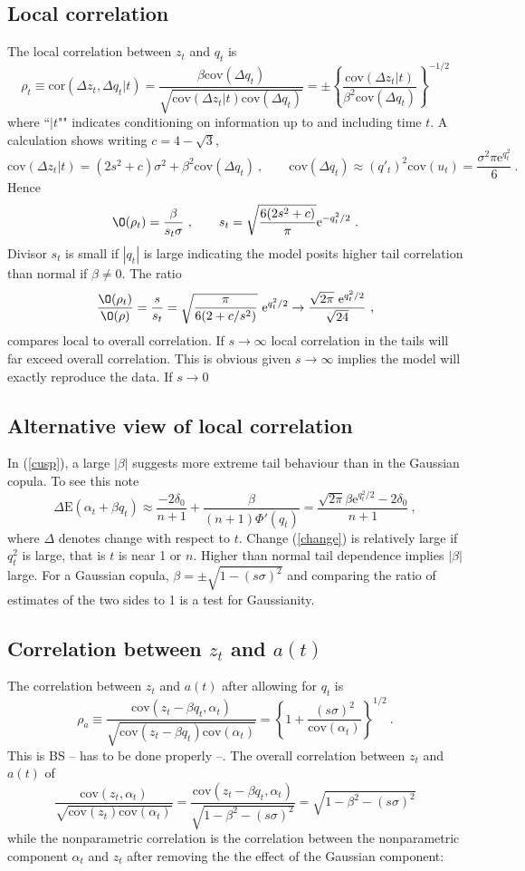 \documentclass[authoryear]{elsarticle}
\newcommand{\E}{\mathrm{E}}
\newcommand{\e}{\mathrm{e}}
\newcommand{\cov}{\mathrm{cov}}
\newcommand{\cor}{\mathrm{cor}}
\newcommand{\eref}[1]{(\ref{#1})}
\newcommand{\cq}{\ , \qquad}
\newcommand{\be}[1]{\begin{equation}\label{#1}}
\newcommand{\ee}{\end{equation}}
\begin{document}
\subsection{Local correlation}
The local correlation between $z_t$ and $q_t$ is 
$$
\rho_t\equiv\cor(\Delta z_t,\Delta q_t|t) =  \frac{\beta\cov(\Delta q_t)}{\sqrt{\cov(\Delta z_t|t)\cov(\Delta q_t)}}=\pm\left\{\frac{\cov(\Delta z_t|t)}{\beta^2\cov(\Delta q_t)}\right\}^{-1/2} 
$$
where ``$|t$"" indicates conditioning on information up to and including time $t$.   A calculation shows writing $c=4-\sqrt 3$,
$$
\cov(\Delta z_t|t)  = (2s^2+c)\sigma^2+\beta^2\cov(\Delta q_t)\cq \cov(\Delta q_t) \approx (q'_t)^2\cov(u_t)= \frac{\sigma^2\pi\e^{q_t^2}}{6}
\ .
$$
Hence
$$
\O(\rho_t) = \frac{\beta}{s_t\sigma }
\cq 
s_t = \sqrt{\frac{6(2s^2+c)}{\pi}}\e^{-q_t^2/2}\ .
$$
Divisor $s_t$ is small if $|q_t|$ is large indicating the model posits higher tail correlation than normal if $\beta\ne 0$.  The ratio
$$
\frac{\O(\rho_t)}{\O(\rho)} =\frac{s}{s_t}= \sqrt{\frac{\pi}{6(2+c/s^2)}}\ \e^{q_t^2/2}\rightarrow \frac{\sqrt{2\pi}\ \e^{q_t^2/2}}{\sqrt{24}}\ ,
$$
compares local  to overall correlation.  If $s\rightarrow\infty$ local correlation in the tails  will far exceed overall  correlation.  This is obvious given $s\rightarrow\infty$ implies the model will exactly reproduce the data.  If $s\rightarrow0$

\subsection{Alternative view of local correlation}
In \eref{cusp},  a large $|\beta|$ suggests more extreme tail behaviour than in the Gaussian copula.  To see this note  
 \be{change}
\Delta \E( \alpha_t + \beta q_t)  \approx \frac{-2\delta_0}{n+1} + \frac{\beta}{(n+1)\Phi'(q_t)}= \frac{\sqrt{2\pi}\beta\e^{q_t^2/2}-2\delta_0}{n+1}\ ,
 \ee
 where $\Delta$ denotes change with respect to $t$.
Change \eref{change} is relatively large if $q_t^2$ is large, that is $t$ is near 1 or $n$. Higher than normal tail dependence implies $|\beta|$ large.  For a Gaussian copula, $\beta=\pm\sqrt{1-(s\sigma)^2}$ and comparing the ratio of estimates of the two sides to 1 is a test for Gaussianity.

\subsection{Correlation between $z_t$ and $a(t)$}
The  correlation between $z_t$ and $a(t)$ after allowing for $q_t$ is
\be{rho2}
\rho_a\equiv\frac{\cov(z_t-\beta q_t,\alpha_t)}{\sqrt{\cov(z_t-\beta q_t)\cov(\alpha_t)}} = \left\{1+\frac{(s\sigma)^2}{\cov(\alpha_t)}\right\}^{1/2}\ .
\ee
This is BS -- has to be done properly --.  The  overall correlation between $z_t$ and $a(t)$ of
$$
\frac{\cov(z_t,\alpha_t)}{\sqrt{\cov(z_t)\cov(\alpha_t)}} = \frac{\cov(z_t-\beta q_t,\alpha_t)}{\sqrt{1-\beta^2-(s\sigma)^2}} =\sqrt{1-\beta^2-(s\sigma)^2}
$$
while the nonparametric correlation is the correlation between the nonparametric component $\alpha_t$ and  $z_t$ after removing the the effect of the Gaussian component:
\end{document}
